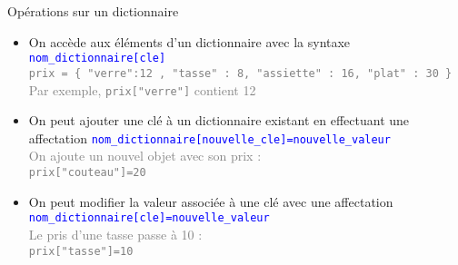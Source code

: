 \documentclass[10pt]{beamer}
\begin{document}
\begin{frame}{\Ctitle}{\stitle}
	\begin{alertblock}{Opérations sur un dictionnaire}
		\begin{itemize}
			\item<1-> On accède aux éléments d'un dictionnaire avec la syntaxe \textcolor{blue}{\tt nom\_dictionnaire[cle]}\\
				\onslide<2->\textcolor{gray}{\footnotesize {\tt prix = \{ "verre":12 , "tasse" : 8, "assiette" : 16, "plat" : 30 \} } \\
					Par exemple, {\tt prix["verre"]} contient 12}
			\item<3-> On peut ajouter une clé à un dictionnaire existant en effectuant une affectation \textcolor{blue}{\tt nom\_dictionnaire[nouvelle\_cle]=nouvelle\_valeur} \\
				\onslide<4->\textcolor{gray}{\footnotesize On ajoute un nouvel objet avec son prix : \\
				{\tt prix["couteau"]=20}
				}
			\item<5-> On peut modifier la valeur associée à une clé avec une affectation \textcolor{blue}{\tt nom\_dictionnaire[cle]=nouvelle\_valeur}\\
				\onslide<6->\textcolor{gray}{\footnotesize Le pris d'une tasse passe à 10 : \\
				{\tt prix["tasse"]=10}
				}
		\end{itemize}
	\end{alertblock}
\end{frame}
\end{document}
